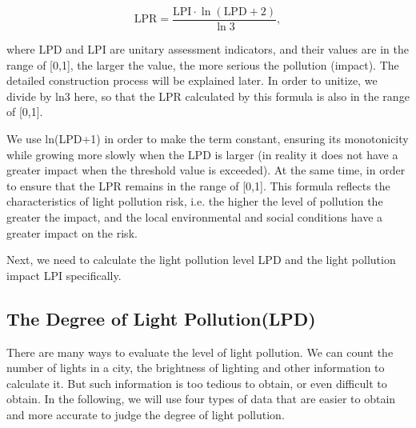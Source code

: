 \documentclass[12pt]{article}
\begin{document}
\begin{equation}
\text{LPR}=\frac{\text{LPI}\cdot\ln(\text{LPD}+2)}{\ln3},
\end{equation}


where LPD and LPI are unitary assessment indicators, and their values are in the range of [0,1], the larger the value, the more serious the pollution (impact). The detailed construction process will be explained later. In order to unitize, we divide by ln3 here, so that the LPR calculated by this formula is also in the range of [0,1].

We use ln(LPD+1) in order to make the term constant, ensuring its monotonicity while growing more slowly when the LPD is larger (in reality it does not have a greater impact when the threshold value is exceeded). At the same time, in order to ensure that the LPR remains in the range of [0,1].
This formula reflects the characteristics of light pollution risk, i.e. the higher the level of pollution the greater the impact, and the local environmental and social conditions have a greater impact on the risk.

Next, we need to calculate the light pollution level LPD and the light pollution impact LPI specifically.
\subsection{The Degree of Light Pollution(LPD)}
There are many ways to evaluate the level of light pollution. We can count the number of lights in a city, the brightness of lighting and other information to calculate it. But such information is too tedious to obtain, or even difficult to obtain. In the following, we will use four types of data that are easier to obtain and more accurate to judge the degree of light pollution.
\end{document}
